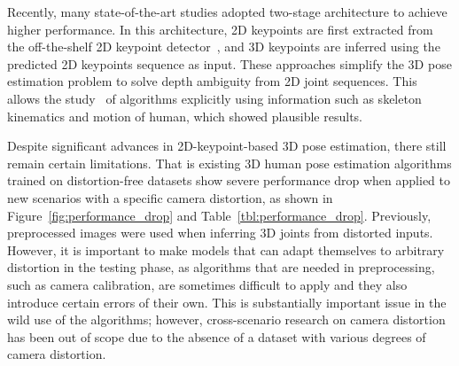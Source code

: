     \begin{table}[t]
    	\centering
    	\small
    	\tabcolsep=1mm
    	\caption{Performance drop in environments with distortion of a network trained with a distortion-free dataset. \small\emph{Distortion 1} \normalsize and \small\emph{Distortion 2} \normalsize  are the cases of barrel distortion and pincushion distortion, with tangential distortion, respectively.}
    	\label{tbl:performance_drop}
    \end{table}

    Recently, many state-of-the-art studies adopted two-stage architecture to achieve higher performance. In this architecture, 2D keypoints are first extracted from the off-the-shelf 2D keypoint detector~\cite{ref13_Chen_2018_CVPR,ref14_He_2017_ICCV,ref15_870a37a4f4e24a66bce3afcddaadf871,ref16_Sun_2019_CVPR}, and 3D keypoints are inferred using the predicted 2D keypoints sequence as input. These approaches simplify the 3D pose estimation problem to solve depth ambiguity from 2D joint sequences. This allows the study~\cite{ref17_DeepKinematics_CVPR2020,ref11_anatomy3D,ref8_zhao2019semantic} of algorithms explicitly using information such as skeleton kinematics and motion of human, which showed plausible results.

    Despite significant advances in 2D-keypoint-based 3D pose estimation, there still remain certain limitations. That is existing 3D human pose estimation algorithms trained on distortion-free datasets show severe performance drop when applied to new scenarios with a specific camera distortion, as shown in Figure~\ref{fig:performance_drop} and Table~\ref{tbl:performance_drop}. Previously, preprocessed images were used when inferring 3D joints from distorted inputs. However, it is important to make models that can adapt themselves to arbitrary distortion in the testing phase, as algorithms that are needed in preprocessing, such as camera calibration, are sometimes difficult to apply and they also introduce certain errors of their own. This is substantially important issue in the wild use of the algorithms; however, cross-scenario research on camera distortion has been out of scope due to the absence of a dataset with various degrees of camera distortion.

